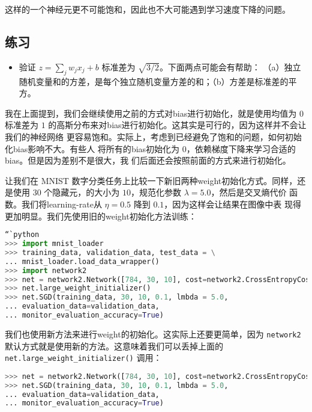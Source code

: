 这样的一个神经元更不可能饱和，因此也不大可能遇到学习速度下降的问题。

\subsection*{练习}

\begin{itemize}
\item 验证 $z = \sum_j w_j x_j + b$ 标准差为 $\sqrt{3/2}$。下面两点可能会有帮助：
  （a）独立随机变量和的方差，是每个独立随机变量方差的和；（b）方差是标准差的平方。
\end{itemize}

我在上面提到，我们会继续使用之前的方式对\gls*{bias}进行初始化，就是使用均值为 $0$ 标准差为
$1$ 的高斯分布来对\gls*{bias}进行初始化。这其实是可行的，因为这样并不会让我们的神经网络
更容易饱和。实际上，考虑到已经避免了饱和的问题，如何初始化\gls*{bias}影响不大。有些人
将所有的\gls*{bias}初始化为 $0$，依赖梯度下降来学习合适的\gls*{bias}。但是因为差别不是很大，我
们后面还会按照前面的方式来进行初始化。

让我们在 MNIST 数字分类任务上比较一下新旧两种\gls*{weight}初始化方式。同样，还是使用 $30$
个隐藏元，\minibatch 的大小为 $10$，规范化参数 $\lambda = 5.0$，然后是交叉熵代价
函数。我们将\gls*{learning-rate}从 $\eta=0.5$ 降到 $0.1$，因为这样会让结果在图像中表
现得更加明显。我们先使用旧的\gls*{weight}初始化方法训练：

\begin{lstlisting}[language=Python]
“`python
>>> import mnist_loader
>>> training_data, validation_data, test_data = \
... mnist_loader.load_data_wrapper()
>>> import network2
>>> net = network2.Network([784, 30, 10], cost=network2.CrossEntropyCost)
>>> net.large_weight_initializer()
>>> net.SGD(training_data, 30, 10, 0.1, lmbda = 5.0,
... evaluation_data=validation_data,
... monitor_evaluation_accuracy=True)
\end{lstlisting}

我们也使用新方法来进行\gls*{weight}的初始化。这实际上还要更简单，因为
\lstinline!network2! 默认方式就是使用新的方法。这意味着我们可以丢掉上面的
\lstinline!net.large_weight_initializer()! 调用：

\begin{lstlisting}[language=Python]
>>> net = network2.Network([784, 30, 10], cost=network2.CrossEntropyCost)
>>> net.SGD(training_data, 30, 10, 0.1, lmbda = 5.0,
... evaluation_data=validation_data,
... monitor_evaluation_accuracy=True)
\end{lstlisting}

